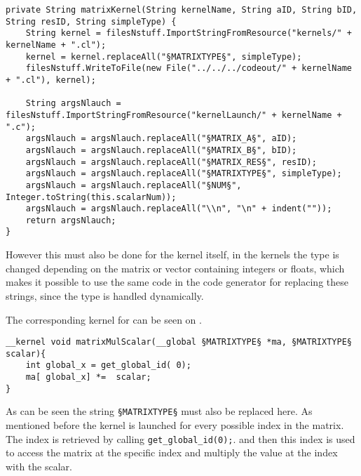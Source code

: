 \begin{lstlisting}[caption=Code for replacing strings with the corresponding information to be appended to the outputCode.,numbers=none,frame=tlrb,label={lst:replaceString}]
private String matrixKernel(String kernelName, String aID, String bID, String resID, String simpleType) {
    String kernel = filesNstuff.ImportStringFromResource("kernels/" + kernelName + ".cl");
    kernel = kernel.replaceAll("§MATRIXTYPE§", simpleType);
    filesNstuff.WriteToFile(new File("../../../codeout/" + kernelName + ".cl"), kernel);

    String argsNlauch = filesNstuff.ImportStringFromResource("kernelLaunch/" + kernelName + ".c");
    argsNlauch = argsNlauch.replaceAll("§MATRIX_A§", aID);
    argsNlauch = argsNlauch.replaceAll("§MATRIX_B§", bID);
    argsNlauch = argsNlauch.replaceAll("§MATRIX_RES§", resID);
    argsNlauch = argsNlauch.replaceAll("§MATRIXTYPE§", simpleType);
    argsNlauch = argsNlauch.replaceAll("§NUM§", Integer.toString(this.scalarNum));
    argsNlauch = argsNlauch.replaceAll("\\n", "\n" + indent(""));
    return argsNlauch;
}
\end{lstlisting}

However this must also be done for the kernel itself, in the kernels the type is changed depending on the matrix or vector containing integers or floats, which makes it possible to use the same code in the code generator for replacing these strings, since the type is handled dynamically.

The corresponding kernel for  can be seen on .
\begin{lstlisting}[caption=Kernel code for multiplying a matrix or vector with a scalar.,numbers=none,frame=tlrb,label={lst:kernel}]
__kernel void matrixMulScalar(__global §MATRIXTYPE§ *ma, §MATRIXTYPE§ scalar){
	int global_x = get_global_id( 0);
	ma[ global_x] *=  scalar;
}
\end{lstlisting}

As can be seen the string \texttt{§MATRIXTYPE§} must also be replaced here.
As mentioned before the kernel is launched for every possible index in the matrix.
The index is retrieved by calling \texttt{get\_global\_id(0);}.
and then this index is used to access the matrix at the specific index and multiply the value at the index with the scalar.

